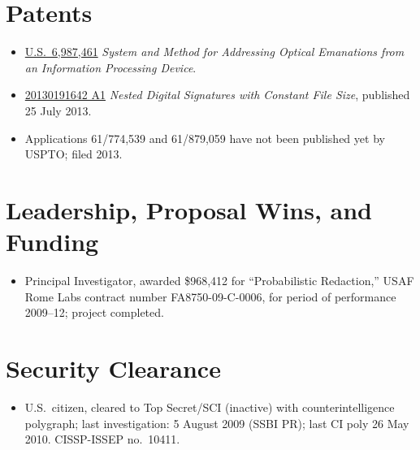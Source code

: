 \documentclass[12pt,twoside,letterpaper]{article}
\begin{document}
\vspace{-9mm}
\section*{Patents}
\vspace{-2mm}
\begin{itemize}
    \item \href{http://www.google.com/patents/US6987461}{U.S.\ 6,987,461}
		\emph{System and Method for Addressing Optical Emanations from an
		Information Processing Device}.
	\vspace{-2mm}
	\item \href{http://appft.uspto.gov/netacgi/nph-Parser?Sect1=PTO1&Sect2=HITOFF&d=PG01&p=1&u=%2Fnetahtml%2FPTO%2Fsrchnum.html&r=1&f=G&l=50&s1=%2220130191642%22.PGNR.&OS=DN/20130191642&RS=DN/20130191642}{20130191642 A1}
		\emph{Nested Digital Signatures with Constant File Size},
		published 25 July 2013.
	\vspace{-1mm}
	\item Applications 61/774,539 and 61/879,059 have not been published
		yet by USPTO; filed 2013.
\end{itemize}

\vspace{-8mm}
\section*{Leadership, Proposal Wins, and Funding}
\vspace{-2mm}
\begin{itemize}
	\item Principal Investigator, awarded \$968,412 for ``Probabilistic Redaction,''
	USAF Rome Labs contract number FA8750-09-C-0006, for period of performance 2009--12;
	project completed.
\end{itemize}

\vspace{-8mm}
\section*{Security Clearance}
\vspace{-2mm}
\begin{itemize}
	\item U.S.\ citizen, cleared to Top Secret/SCI (inactive) with counterintelligence
		polygraph; last investigation: 5 August 2009 (SSBI PR); last CI poly 26 May 2010.
		CISSP-ISSEP no.\ 10411.
\end{itemize}
\end{document}
